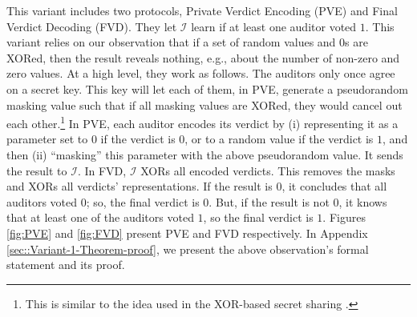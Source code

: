 This variant includes two protocols,  Private Verdict Encoding (PVE) and Final Verdict Decoding (FVD). They  let $\mathcal{I}$ learn if at least one auditor voted $1$. This variant   relies on our observation that   if   a set of random values and $0$s are XORed, then the result   reveals nothing, e.g.,  about the number of non-zero and  zero values. At a high level, they work as follows.  The auditors only once agree on a secret key. This key will let each of them, in PVE,  generate a pseudorandom masking value such that if all masking values are XORed, they would cancel out each other.\footnote{This is similar to the idea used in the XOR-based secret sharing \cite{Schneier0078909}.} In PVE, each auditor encodes its verdict by (i) representing it as a parameter  set to  $0$ if the verdict is $0$, or to a random value if the verdict is $1$, and then (ii) ``masking'' this parameter with the above  pseudorandom value.  It sends the result to $\mathcal{I}$.  In FVD,  $\mathcal{I}$   XORs all encoded verdicts. This removes the masks and XORs all verdicts' representations.  If the result is $0$,   it concludes that  all auditors  voted $0$; so,  the final verdict is $0$. But, if the result is not $0$,  it knows that at least one of the auditors voted $1$, so  the final verdict is $1$. Figures \ref{fig:PVE} and \ref{fig:FVD} present  PVE and FVD respectively.  In Appendix \ref{sec::Variant-1-Theorem-proof}, we present the above observation's formal statement and  its proof.  %


 
